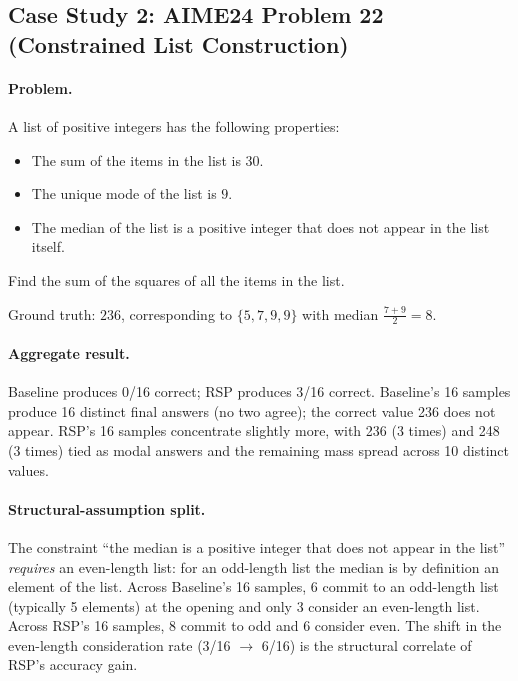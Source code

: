 \subsection{Case Study 2: AIME24 Problem 22 (Constrained List Construction)}\label{app:qualitative_case2}

\paragraph{Problem.}
\begin{tcolorbox}[colback=gray!5, colframe=black!60, arc=3pt, boxrule=0.5pt, fontupper=\footnotesize, breakable]
A list of positive integers has the following properties:
\begin{itemize}\setlength{\itemsep}{0pt}
  \item The sum of the items in the list is $30$.
  \item The unique mode of the list is $9$.
  \item The median of the list is a positive integer that does not appear in the list itself.
\end{itemize}
Find the sum of the squares of all the items in the list.
\end{tcolorbox}
Ground truth: $\boxed{236}$, corresponding to $\{5, 7, 9, 9\}$ with median $\frac{7+9}{2} = 8$.

\paragraph{Aggregate result.} Baseline produces 0/16 correct; RSP produces 3/16 correct. Baseline's 16 samples produce 16 distinct final answers (no two agree); the correct value 236 does not appear. RSP's 16 samples concentrate slightly more, with 236 (3 times) and 248 (3 times) tied as modal answers and the remaining mass spread across 10 distinct values.

\paragraph{Structural-assumption split.} The constraint ``the median is a positive integer that does not appear in the list'' \emph{requires} an even-length list: for an odd-length list the median is by definition an element of the list. Across Baseline's 16 samples, 6 commit to an odd-length list (typically 5 elements) at the opening and only 3 consider an even-length list. Across RSP's 16 samples, 8 commit to odd and 6 consider even. The shift in the even-length consideration rate (3/16 $\to$ 6/16) is the structural correlate of RSP's accuracy gain.

